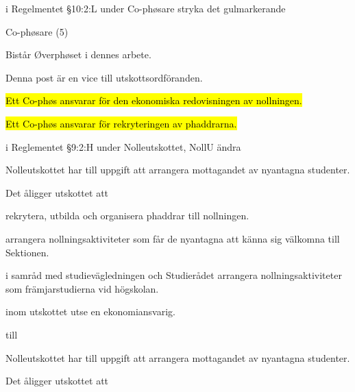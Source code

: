\documentclass[../_main/handlingar.tex]{subfiles}
\begin{document}
\begin{attsatser}

    \att i Regelmentet \S10:2:L under Co-phøsare stryka det gulmarkerande

    \begin{emptylist}
        \item Co-phøsare (5)
        \begin{dashlist}
            \item Bistår Øverphøset i dennes arbete.
            \item Denna post är en vice till utskottsordföranden.
            \item \hl{Ett Co-phøs ansvarar för den ekonomiska redovisningen av nollningen.}
            \item \hl{Ett Co-phøs ansvarar för rekryteringen av phaddrarna.}
        \end{dashlist}
        \changenote
    \end{emptylist}


    \att i Reglementet \S9:2:H under Nolleutskottet, NollU ändra 

    \begin{emptylist}
        \item Nolleutskottet har till uppgift att arrangera mottagandet av nyantagna studenter.
    
        \item Det åligger utskottet att

        \begin{dashlist}
            \item rekrytera, utbilda och organisera phaddrar till nollningen.
            \item arrangera nollningsaktiviteter som får de nyantagna att känna sig välkomna till Sektionen.
            \item i samråd med studievägledningen och Studierådet arrangera nollningsaktiviteter som främjarstudierna vid högskolan.
            \item inom utskottet utse en ekonomiansvarig.
        \end{dashlist}
    \end{emptylist}

    till 

    
    \begin{emptylist}
        \item Nolleutskottet har till uppgift att arrangera mottagandet av nyantagna studenter.
        
        \item Det åligger utskottet att


\end{emptylist}
\end{attsatser}
\end{document}
